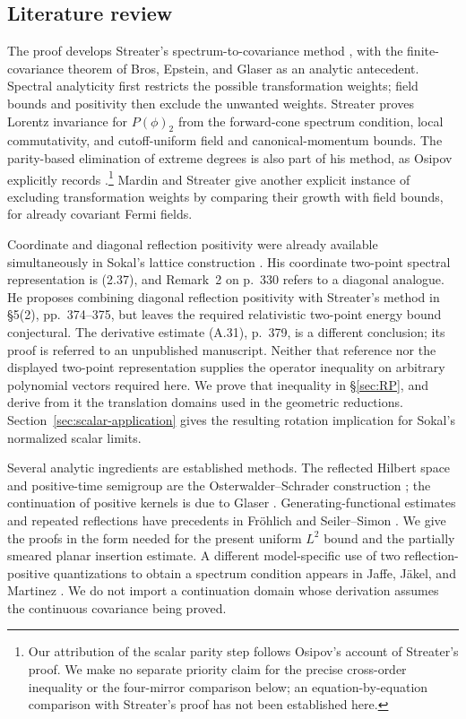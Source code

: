 \documentclass[11pt, letterpaper, reqno]{amsart}
\theoremstyle{definition}
\theoremstyle{remark}
\begin{document}
\subsection{Literature review}

The proof develops Streater's spectrum-to-covariance method
\cite{Streater}, with the finite-covariance theorem of Bros, Epstein, and
Glaser \cite{BEG} as an analytic antecedent. Spectral analyticity first
restricts the possible transformation weights; field bounds and positivity
then exclude the unwanted weights. Streater proves Lorentz invariance for
$P(\phi)_2$ from the forward-cone spectrum condition, local commutativity,
and cutoff-uniform field and canonical-momentum bounds. The parity-based
elimination of extreme degrees is also part of his method, as Osipov
explicitly records \cite{O}.\footnote{Our attribution of the scalar
parity step follows Osipov's account of Streater's proof. We make no
separate priority claim for the precise cross-order inequality or the
four-mirror comparison below; an equation-by-equation comparison with
Streater's proof has not been established here.}
Mardin and Streater \cite[pp.~82--83]{MardinStreater} give another
explicit instance of excluding transformation weights by comparing their
growth with field bounds, for already covariant Fermi fields.

Coordinate and diagonal reflection positivity were already available
simultaneously in Sokal's lattice construction
\cite[pp.~328--330]{Sokal}. His coordinate two-point spectral
representation is (2.37), and Remark~2 on p.~330 refers to a diagonal
analogue. He proposes combining diagonal reflection positivity with
Streater's method in \S5(2), pp.~374--375, but leaves the required
relativistic two-point energy bound conjectural. The derivative estimate
(A.31), p.~379, is a different conclusion; its proof is referred to an
unpublished manuscript. Neither that reference nor the displayed
two-point representation supplies the operator inequality on arbitrary
polynomial vectors required here. We prove that inequality in
\S\ref{sec:RP}, and derive from it the translation domains used in the
geometric reductions. Section~\ref{sec:scalar-application} gives the
resulting rotation implication for Sokal's normalized scalar limits.

Several analytic ingredients are established methods. The reflected
Hilbert space and positive-time semigroup are the Osterwalder--Schrader
construction \cite{OS,OS2}; the continuation of positive kernels is due
to Glaser \cite[Theorem~A]{Glaser}. Generating-functional estimates and
repeated reflections have precedents in Fr\"ohlich
\cite[Lemma~3.2]{Frohlich} and Seiler--Simon
\cite[Theorems~4.3, 7.1, and~8.2]{SeilerSimon}. We give the proofs in
the form needed for the present uniform $L^2$ bound and the partially
smeared planar insertion estimate. A different model-specific use of two
reflection-positive quantizations to obtain a spectrum condition appears
in Jaffe, J\"akel, and Martinez
\cite[Proposition~VI.1]{JJM}. We do not import a continuation domain
whose derivation assumes the continuous covariance being proved.
\end{document}
